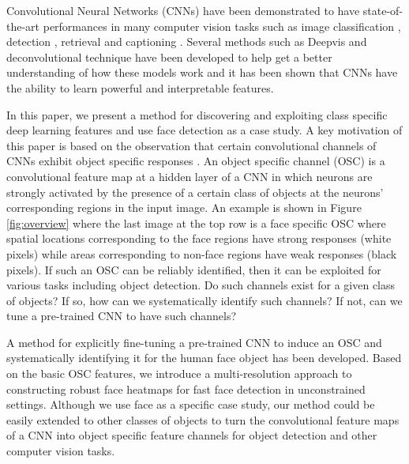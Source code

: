 \documentclass[10pt,twocolumn,letterpaper]{article}
\begin{document}
Convolutional Neural Networks (CNNs) have been demonstrated to have state-of-the-art performances in many computer vision tasks such as image classification \cite{krizhevsky2012imagenet,simonyan2014very}, detection \cite{girshick2014rich,sermanet2013overfeat}, retrieval \cite{babenko2014neural} and captioning \cite{karpathy2015deep}. %
Several methods such as Deepvis \cite{yosinski2015understanding} and deconvolutional technique \cite{zeiler2014visualizing} have been developed to help get a better understanding of how these models work and it has been shown that CNNs have the ability to learn powerful and interpretable features. 

In this paper, we present a method for discovering and exploiting class specific deep learning features and use face detection as a case study. A key motivation of this paper is based on the observation that certain convolutional channels of CNNs exhibit object specific responses \cite{yosinski2015understanding}. An object specific channel (OSC) is a convolutional feature map at a hidden layer of a CNN in which neurons are strongly activated by the presence of a certain class of objects at the neurons' corresponding regions in the input image. An example is shown in Figure \ref{fig:overview} where the last image at the top row is a face specific OSC where spatial locations corresponding to the face regions have strong responses (white pixels) while areas corresponding to non-face regions have weak responses (black pixels). If such an OSC can be reliably identified, then it can be exploited for various tasks including object detection. Do such channels exist for a given class of objects? If so, how can we systematically identify such channels? If not, can we tune a pre-trained CNN to have such channels?   

A method for explicitly fine-tuning a pre-trained CNN to induce an OSC and systematically identifying it for the human face object has been developed. Based on the basic OSC features, we introduce a multi-resolution approach to constructing robust face heatmaps for fast face detection in unconstrained settings. Although we use face as a specific case study, our method could be easily extended to other classes of objects to turn the convolutional feature maps of a CNN into object specific feature channels for object detection and other computer vision tasks.
 
\end{document}
